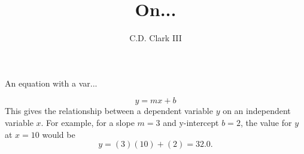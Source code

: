 \documentclass[]{article}
\author{C.D. Clark III}
\title{On...}
\begin{document}
\maketitle
An equation with a var...

$$
y = \mathit{m}\mathit{x} + \mathit{b}
$$
This gives the relationship between a dependent variable $y$ on an independent variable $x$.
For example, for a slope $m = 3$ and y-intercept $b = 2$, the value for $y$ at $x = 10$ would be
$$
y = \left(3\right)\left(10\right) + \left(2\right) = 32.0.
$$
\end{document}
